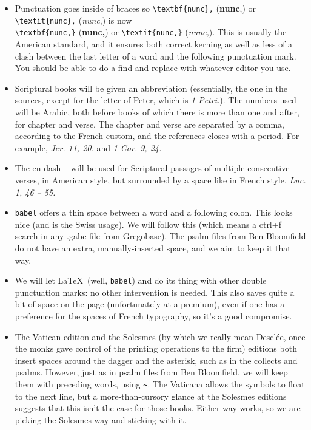 \documentclass[11pt]{article}
\begin{document}
\begin{itemize}
\item
 Punctuation goes inside of braces so \verb|\textbf{nunc},| (\textbf{nunc},) or \verb|\textit{nunc},| (\textit{nunc},) is now\\ \verb|\textbf{nunc,}| (\textbf{nunc,}) or \verb|\textit{nunc,}| (\textit{nunc,}). This is usually the American standard, and it ensures both correct kerning as well as less of a clash between the last letter of a word and the following punctuation mark. You should be able to do a find-and-replace with whatever editor you use.
 \item
Scriptural books will be given an abbreviation (essentially, the one in the sources, except for the letter of Peter, which is \textit{1 Petri.}). The numbers used will be Arabic, both before books of which there is more than one and after, for chapter and verse. The chapter and verse are separated by a comma, according to the French custom, and the references closes with a period.
 For example, \hspace{0.05em}\textit{Jer. 11, 20.} and \textit{1 Cor. 9, 24.}
 \item
The en dash \verb|–| will be used for Scriptural passages of multiple consecutive verses, in American style, but surrounded by a space like in French style. \textit{Luc. 1, 46 – 55.}
\item
\verb|babel| offers a thin space between a word and a following colon. This looks nice (and is the Swiss usage). We will follow this (which means a ctrl+f search in any .gabc file from Gregobase). The psalm files from Ben Bloomfield do not have an extra, manually-inserted space, and we aim to keep it that way.
\item
We will let \LaTeX\ (well, \verb|babel|) and do its thing with other double punctuation marks: no other intervention is needed. This also saves quite a bit of space on the page (unfortunately at a premium), even if one has a preference for the spaces of French typography, so it's a good compromise.
\item
The Vatican edition and the Solesmes (by which we really mean Desclée, once the monks gave control of the printing operations to the firm) editions both insert spaces around the dagger and the asterisk, such as in the collects and psalms. However, just as in psalm files from Ben Bloomfield, we will keep them with preceding words, using \verb|~|. The Vaticana allows the symbols to float to the next line, but  a more-than-cursory glance at the Solesmes editions suggests that this isn't the case for those books. Either way works, so we are picking the Solesmes way and sticking with it.

\end{itemize}
\end{document}

